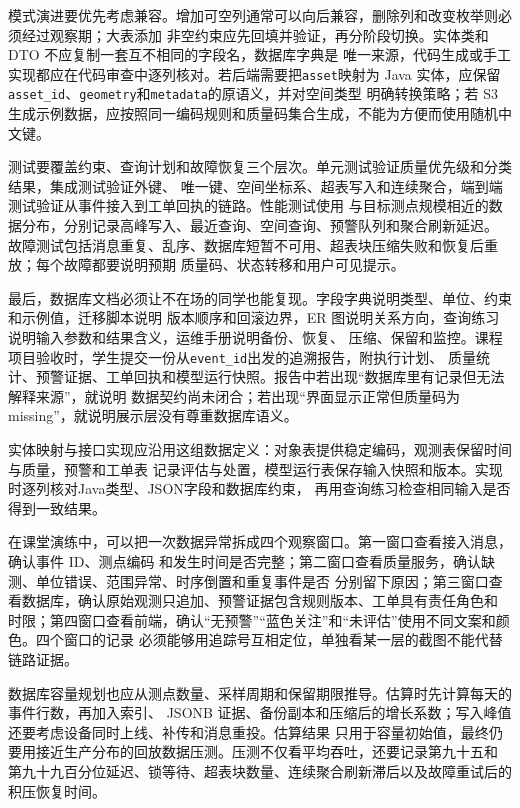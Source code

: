 模式演进要优先考虑兼容。增加可空列通常可以向后兼容，删除列和改变枚举则必须经过观察期；大表添加
非空约束应先回填并验证，再分阶段切换。实体类和 DTO 不应复制一套互不相同的字段名，数据库字典是
唯一来源，代码生成或手工实现都应在代码审查中逐列核对。若后端需要把\texttt{asset}映射为 Java
实体，应保留\texttt{asset\_id}、\texttt{geometry}和\texttt{metadata}的原语义，并对空间类型
明确转换策略；若 S3 生成示例数据，应按照同一编码规则和质量码集合生成，不能为方便而使用随机中文键。

测试要覆盖约束、查询计划和故障恢复三个层次。单元测试验证质量优先级和分类结果，集成测试验证外键、
唯一键、空间坐标系、超表写入和连续聚合，端到端测试验证从事件接入到工单回执的链路。性能测试使用
与目标测点规模相近的数据分布，分别记录高峰写入、最近查询、空间查询、预警队列和聚合刷新延迟。
故障测试包括消息重复、乱序、数据库短暂不可用、超表块压缩失败和恢复后重放；每个故障都要说明预期
质量码、状态转移和用户可见提示。

最后，数据库文档必须让不在场的同学也能复现。字段字典说明类型、单位、约束和示例值，迁移脚本说明
版本顺序和回滚边界，ER 图说明关系方向，查询练习说明输入参数和结果含义，运维手册说明备份、恢复、
压缩、保留和监控。课程项目验收时，学生提交一份从\texttt{event\_id}出发的追溯报告，附执行计划、
质量统计、预警证据、工单回执和模型运行快照。报告中若出现“数据库里有记录但无法解释来源”，就说明
数据契约尚未闭合；若出现“界面显示正常但质量码为 missing”，就说明展示层没有尊重数据库语义。

实体映射与接口实现应沿用这组数据定义：对象表提供稳定编码，观测表保留时间与质量，预警和工单表
记录评估与处置，模型运行表保存输入快照和版本。实现时逐列核对Java类型、JSON字段和数据库约束，
再用查询练习检查相同输入是否得到一致结果。

在课堂演练中，可以把一次数据异常拆成四个观察窗口。第一窗口查看接入消息，确认事件 ID、测点编码
和发生时间是否完整；第二窗口查看质量服务，确认缺测、单位错误、范围异常、时序倒置和重复事件是否
分别留下原因；第三窗口查看数据库，确认原始观测只追加、预警证据包含规则版本、工单具有责任角色和
时限；第四窗口查看前端，确认“无预警”“蓝色关注”和“未评估”使用不同文案和颜色。四个窗口的记录
必须能够用追踪号互相定位，单独看某一层的截图不能代替链路证据。

数据库容量规划也应从测点数量、采样周期和保留期限推导。估算时先计算每天的事件行数，再加入索引、
JSONB 证据、备份副本和压缩后的增长系数；写入峰值还要考虑设备同时上线、补传和消息重投。估算结果
只用于容量初始值，最终仍要用接近生产分布的回放数据压测。压测不仅看平均吞吐，还要记录第九十五和
第九十九百分位延迟、锁等待、超表块数量、连续聚合刷新滞后以及故障重试后的积压恢复时间。

